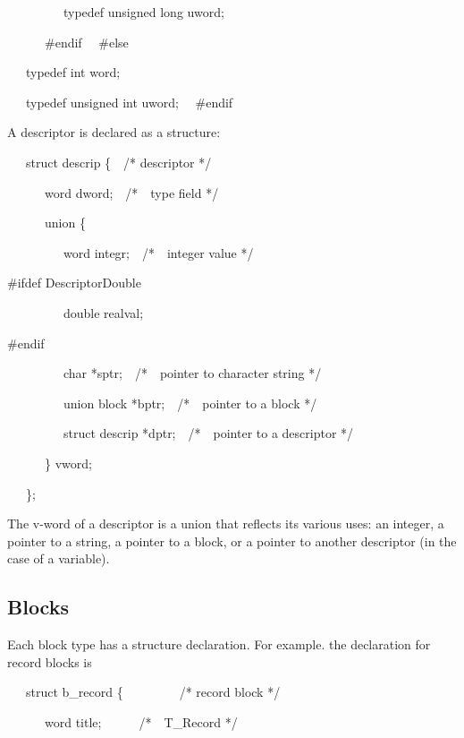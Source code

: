 {\ttfamily\mdseries
\ \ \ \ \ \ \ \ \ typedef unsigned long uword;}

{\ttfamily\mdseries
\textcolor[rgb]{0.0,0.0,0.8}{\ \ \ \ \ \ \#endif\newline
} \ \ \#else}

{\ttfamily\mdseries
\ \ \ typedef int word;}

{\ttfamily\mdseries
\ \ \ typedef unsigned int uword;\newline
 \ \ \#endif}


A descriptor is declared as a structure:

{\ttfamily\mdseries
\ \ \ struct descrip \{\ \ /* descriptor */}

{\ttfamily\mdseries
\ \ \ \ \ \ word dword;\ \ /*\ \ type field */}

{\ttfamily\mdseries
\ \ \ \ \ \ union \{}

{\ttfamily\mdseries
\ \ \ \ \ \ \ \ \ word integr;\ \ /*\ \ integer value */}

{\ttfamily\color[rgb]{0.0,0.0,0.8}
\#ifdef DescriptorDouble}

{\ttfamily\color[rgb]{0.0,0.0,0.8}
\ \ \ \ \ \ \ \ \ double realval;}

{\ttfamily\color[rgb]{0.0,0.0,0.8}
\#endif}

{\ttfamily\mdseries
\ \ \ \ \ \ \ \ \ char *sptr;\ \ /*\ \ pointer to character string */}

{\ttfamily\mdseries
\ \ \ \ \ \ \ \ \ union block *bptr;\ \ /*\ \ pointer to a block */}

{\ttfamily\mdseries
\ \ \ \ \ \ \ \ \ struct descrip *dptr;\ \ /*\ \ pointer to a descriptor */}

{\ttfamily\mdseries
\ \ \ \ \ \ \} vword;}

{\ttfamily\mdseries
\ \ \ \};}


The v-word of a descriptor is a union that reflects its various uses:
an integer, a pointer to a string, a pointer to a block, or a pointer
to another descriptor (in the case of a variable).

\subsection{Blocks}

Each block type has a structure declaration. For example. the
declaration for record blocks is

{\ttfamily\mdseries
\ \ \ struct b\_record \{\ \  \ \ \ \ \ \ \ /* record block */}

{\ttfamily\mdseries
\ \ \ \ \ \ word title;\ \ \ \ \ \ /*\ \ T\_Record */}

